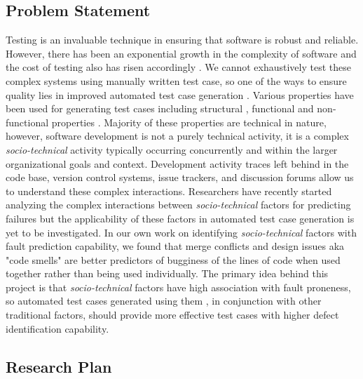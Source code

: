 \documentclass[10pt]{article}
\begin{document}
\subsection{Problem Statement}
Testing is an invaluable technique in ensuring that software is robust and reliable. However, there has been an exponential growth in the complexity of software and the cost of testing also has risen accordingly \cite{myers2011art}. We cannot exhaustively test these complex systems using manually written test case, so one of the ways to ensure quality lies in improved automated test case generation \cite{anand2013orchestrated,harman2012search}. Various properties have been used for generating test cases including
structural \cite{tonella2004evolutionary}, functional \cite{wegener2004evaluation} and non-functional properties \cite{wegener1998verifying}. Majority of these properties are technical in nature, however, software development is not a purely technical activity, it is a complex \emph{socio-technical} activity typically occurring concurrently and within the larger organizational goals and context. Development activity traces left behind in the code base, version control systems, issue trackers, and discussion forums allow us to understand these complex interactions. Researchers have recently started analyzing the complex interactions between \emph{socio-technical} factors for predicting failures but the applicability of these factors in automated test case generation is yet to be investigated. In our own work on identifying \emph{socio-technical} factors with fault prediction capability, we found that merge conflicts and design issues aka "code smells" are better predictors of bugginess of the lines of code \cite{ahmedempirical} when used together rather than being used individually. The primary idea behind this project is that \emph{socio-technical} factors have high association with fault proneness, so automated test cases generated using them , in conjunction with other traditional factors, should provide more effective test cases with  higher defect identification capability.

\subsection{Research Plan}
\end{document}
